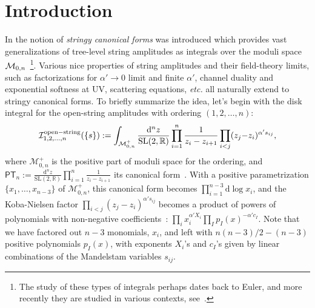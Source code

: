 \documentclass[hidelinks,12pt]{article}
\begin{document}
\section{Introduction}
In \cite{Arkani-Hamed:2019mrd} the notion of {\it stringy canonical forms} was introduced which provides vast generalizations of tree-level string amplitudes as integrals over the moduli space ${\cal M}_{0, n}$~\footnote{The study of these types of integrals perhaps dates back to Euler, and more recently they are studied in various contexts, see~\cite{Mellin, Eulermellin, Panzer:2019yxl}. }. Various nice properties of string amplitudes and their field-theory limits, such as factorizations for $\alpha' \to 0$ limit and finite $\alpha'$, channel duality and exponential softness at UV, scattering equations, {\it etc.} all naturally extend to stringy canonical forms. To briefly summarize the idea, let's begin with the disk integral for the open-string amplitudes with ordering $(1,2,\dots, n)$:
\begin{equation}\label{stringint}
{\cal I}^{\rm open-string}_{1,2,\dots,n} (\{s\}):=\int_{\mathcal M_{0,n}^+}
\frac{\mathrm d^{n}z}{\mathrm{SL}(2,\mathbb{R})} \prod_{i=1}^{n}\frac{1}{z_{i}-z_{i{+}1}}
\prod_{i<j}(z_j{-}z_i)^{\alpha' s_{ij}},
\end{equation}
where $\mathcal M_{0,n}^+$ is the positive part of moduli space for the ordering, and $\mathsf{PT}_n:=\frac{\mathrm d^{n}z}{\mathrm{SL}(2,\mathbb{R})} \prod_{i=1}^{n}\frac{1}{z_{i}-z_{i+1}}$ its canonical form~\cite{Arkani-Hamed:2017mur}.  %
With a positive parametrization $\{x_1,\dots,x_{n-3}\}$ of $\mathcal M_{0,n}^+$, 
this canonical form becomes $\prod_{i=1}^{n-3}\mathrm d \log x_i$, and the Koba-Nielsen factor $\prod_{i<j}(z_j-z_i)^{\alpha' s_{i j}}$ becomes a product of powers of polynomials with 
non-negative coefficients~\cite{Arkani-Hamed:2019mrd}: $\prod_i x_i^{\alpha' X_i} \prod_I p_I(x)^{-\alpha' c_I}$. Note that we have factored out $n{-}3$ monomials, $x_i$, and left with $n(n{-}3)/2-(n{-}3)$ positive polynomials $p_I(x)$, with exponents $X_i$'s and $c_I$'s given by linear combinations of the Mandelstam variables $s_{ij}$. 
\end{document}
